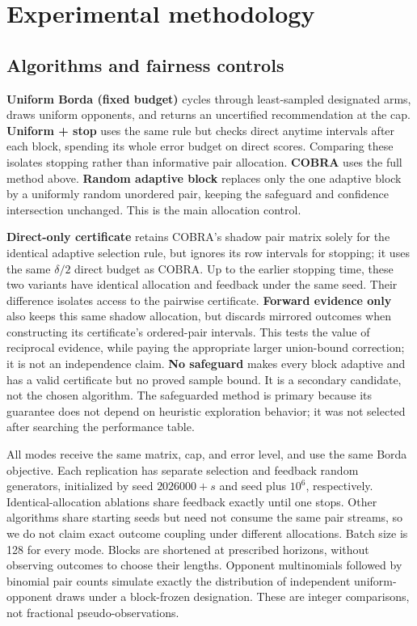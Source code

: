 \documentclass[11pt,a4paper]{article}
\begin{document}
\section{Experimental methodology}
\subsection{Algorithms and fairness controls}
\textbf{Uniform Borda (fixed budget)} cycles through least-sampled designated arms, draws uniform opponents, and returns an uncertified recommendation at the cap. \textbf{Uniform + stop} uses the same rule but checks direct anytime intervals after each block, spending its whole error budget on direct scores. Comparing these isolates stopping rather than informative pair allocation. \textbf{COBRA} uses the full method above. \textbf{Random adaptive block} replaces only the one adaptive block by a uniformly random unordered pair, keeping the safeguard and confidence intersection unchanged. This is the main allocation control.

\textbf{Direct-only certificate} retains COBRA's shadow pair matrix solely for the identical adaptive selection rule, but ignores its row intervals for stopping; it uses the same $\delta/2$ direct budget as COBRA. Up to the earlier stopping time, these two variants have identical allocation and feedback under the same seed. Their difference isolates access to the pairwise certificate. \textbf{Forward evidence only} also keeps this same shadow allocation, but discards mirrored outcomes when constructing its certificate's ordered-pair intervals. This tests the value of reciprocal evidence, while paying the appropriate larger union-bound correction; it is not an independence claim. \textbf{No safeguard} makes every block adaptive and has a valid certificate but no proved sample bound. It is a secondary candidate, not the chosen algorithm. The safeguarded method is primary because its guarantee does not depend on heuristic exploration behavior; it was not selected after searching the performance table.

All modes receive the same matrix, cap, and error level, and use the same Borda objective. Each replication has separate selection and feedback random generators, initialized by seed $2026000+s$ and seed plus $10^6$, respectively. Identical-allocation ablations share feedback exactly until one stops. Other algorithms share starting seeds but need not consume the same pair streams, so we do not claim exact outcome coupling under different allocations. Batch size is 128 for every mode. Blocks are shortened at prescribed horizons, without observing outcomes to choose their lengths. Opponent multinomials followed by binomial pair counts simulate exactly the distribution of independent uniform-opponent draws under a block-frozen designation. These are integer comparisons, not fractional pseudo-observations.
\end{document}
